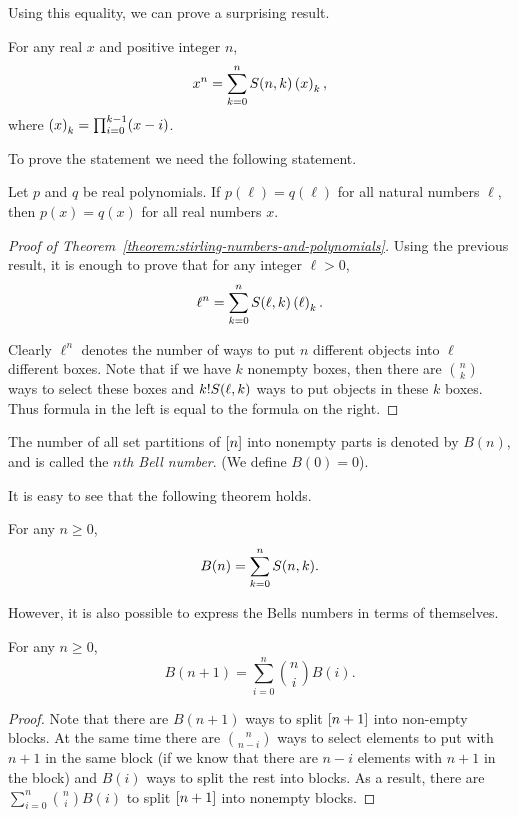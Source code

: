 Using this equality, we can prove a surprising result.
\begin{theorem}
\label{theorem:stirling-numbers-and-polynomials}
  For any real $x$ and positive integer $n$,
  \[
    x^n = \sum_{k = 0}^n \stirlingTwo{n}{k} \numberOfPermutations[k]{x},
  \]
  where $\numberOfPermutations[k]{x} = \prod_{i = 0}^{k - 1} (x - i)$.
\end{theorem}

To prove the statement we need the following statement.
\begin{theorem}
  Let $p$ and $q$ be real polynomials. If $p(\ell) = q(\ell)$ for all
  natural numbers $\ell$, then $p(x) = q(x)$ for all real numbers $x$.
\end{theorem}

\begin{proof}[Proof of Theorem~\ref{theorem:stirling-numbers-and-polynomials}]
  Using the previous result, it is enough to prove that
  for any integer $\ell > 0$,
  \[
    \ell^n = \sum_{k = 0}^n \stirlingTwo{\ell}{k} \numberOfPermutations[k]{\ell}.
  \]

  Clearly $\ell^n$ denotes the number of ways to put $n$ different
  objects into $\ell$ different boxes. Note that if we have $k$ nonempty
  boxes, then there are $\binom{n}{k}$ ways to select these boxes and
  $k! S({\ell}, {k})$ ways to put objects in these $k$ boxes. Thus formula in
  the left is equal to the formula on the right.
\end{proof}

\begin{definition}
  The number of all set partitions of ${[{n}]}$ into nonempty parts
  is denoted by $B(n)$, and is called the \emph{$n$th Bell number}.
  (We define $B(0) = 0$).
\end{definition}


It is easy to see that the following theorem holds.
\begin{theorem}
  For any $n \ge 0$,
  \[
    B(n) = \sum_{k = 0}^n S({n}, {k}).
  \]
\end{theorem}

However, it is also possible to express the Bells numbers in terms
of themselves.
\begin{theorem}
  For any $n \ge 0$,
  \[
    B(n + 1) = \sum_{i = 0}^n \binom{n}{i} B(i).
  \]
\end{theorem}
\begin{proof}
  Note that there are $B(n + 1)$ ways to split ${[{n + 1}]}$ into
  non-empty blocks. At the same time there are $\binom{n}{n - i}$
  ways to select elements to put with $n + 1$ in the same block
  (if we know that there are $n - i$ elements with $n + 1$ in the block)
  and $B(i)$ ways to split the rest into blocks. As a result,
  there are $\sum_{i = 0}^n \binom{n}{i} B(i)$ to split ${[{n + 1}]}$
  into nonempty blocks.
\end{proof}

